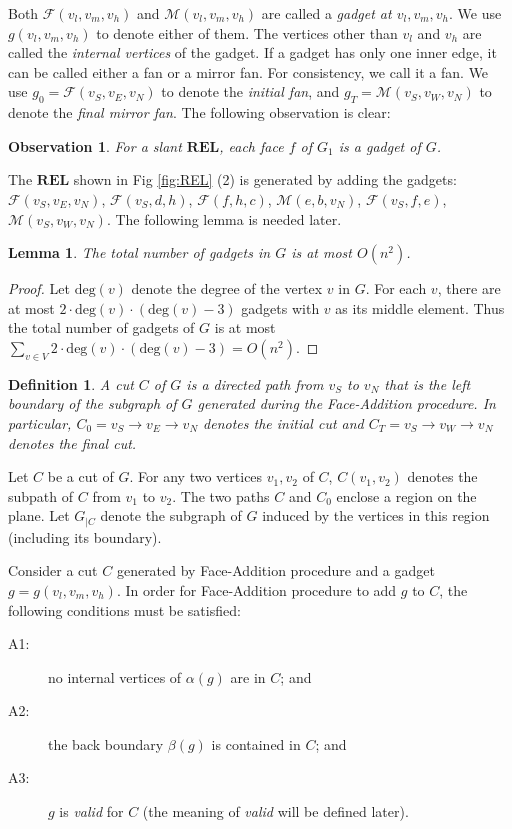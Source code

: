 \documentclass[11pt]{article}
\newcommand{\FF}{\mathcal{F}}
\newcommand{\MM}{\mathcal{M}}
\newcommand{\REL}{\mathbf{REL}}
\newtheorem{definition}[figure]{Definition}
\newtheorem{lemma}[figure]{Lemma}
\newtheorem{observation}[figure]{Observation}
\begin{document}
Both $\FF(v_l, v_m, v_h)$ and $\MM(v_l, v_m, v_h)$ are
called a {\em gadget at $v_l,v_m, v_h$}. We use $g(v_l, v_m, v_h)$ to
denote either of them. The vertices other than $v_l$ and $v_h$
are called the {\em internal vertices} of the gadget.
If a gadget has only one inner edge, it can be called either
a fan or a mirror fan. For consistency, we call it a fan.
We use $g_0=\FF(v_S,v_E,v_N)$ to denote the {\em initial fan}, and
$g_T=\MM(v_S,v_W,v_N)$ to denote the {\em final mirror fan}.
The following observation is clear:

\begin{observation}\label{obs:slant}
For a slant $\REL$, each face $f$ of $G_1$ is a gadget of $G$.
\end{observation}

The $\REL$ shown in Fig \ref{fig:REL} (2) is generated by adding the
gadgets: $\FF(v_S,v_E,v_N)$, $\FF(v_S,d,h)$,
$\FF(f,h,c)$, $\MM(e,b,v_N)$, $\FF(v_S,f,e)$, $\MM(v_S,v_W,v_N)$.
The following lemma is needed later.

\begin{lemma}\label{lemma:number}
The total number of gadgets in $G$ is at most $O(n^2)$.
\end{lemma}

\begin{proof}
Let $\mbox{deg}(v)$ denote the degree of the vertex $v$ in $G$. For each
$v$, there are at most $2\cdot\mbox{deg}(v)\cdot (\mbox{deg}(v)-3)$
gadgets with $v$ as its middle element. Thus the total number of gadgets
of $G$ is at most
$\sum_{v\in V}2\cdot\mbox{deg}(v) \cdot (\mbox{deg}(v)-3) = O(n^2)$.
\end{proof}

\begin{definition}\label{def:cut}
A \emph{cut} $C$ of $G$ is a directed path from $v_S$ to $v_N$ that is
the left boundary of the subgraph of $G$ generated during the
Face-Addition procedure. In particular,
$C_0= v_S\rightarrow v_E \rightarrow v_N$ denotes the {\em initial cut} and
$C_T= v_S\rightarrow v_W \rightarrow v_N$ denotes the {\em final cut}.
\end{definition}

Let $C$ be a cut of $G$. For any two vertices $v_1, v_2$ of $C$, $C(v_1, v_2)$
denotes the subpath of $C$ from $v_1$ to $v_2$. The two paths $C$ and $C_0$
enclose a region on the plane. Let $G_{|C}$ denote the subgraph
of $G$ induced by the vertices in this region (including its boundary).

Consider a cut $C$ generated by Face-Addition procedure
and a gadget $g=g(v_l, v_m, v_h)$. In order for Face-Addition procedure
to add $g$ to $C$, the following conditions must be satisfied:
\begin{description}
\item[A1:] no internal vertices of $\alpha(g)$ are in $C$; and
\item[A2:] the back boundary $\beta(g)$ is contained in $C$; and
\item[A3:] $g$ is {\em valid} for $C$ (the meaning of {\em valid}
will be defined later).
\end{description}
\end{document}
